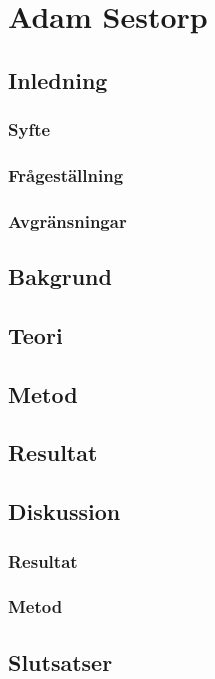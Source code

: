 \section{Adam Sestorp}
\subsection{Inledning}
\subsubsection{Syfte}
\subsubsection{Frågeställning}
\subsubsection{Avgränsningar}
\subsection{Bakgrund}
\subsection{Teori}
\subsection{Metod}
\subsection{Resultat}
\subsection{Diskussion}
\subsubsection{Resultat}
\subsubsection{Metod}
\subsection{Slutsatser}
